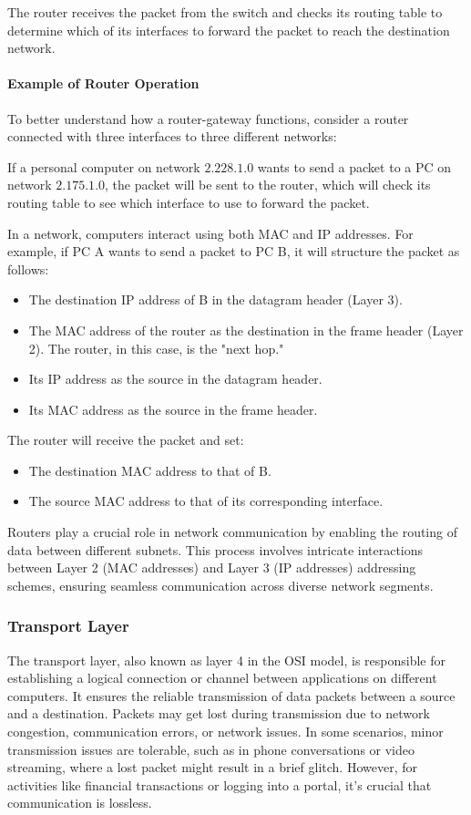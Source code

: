 The router receives the packet from the switch and checks its routing table to determine which of its interfaces to forward the packet to reach the destination network.

\paragraph{Example of Router Operation}
To better understand how a router-gateway functions, consider a router connected with three interfaces to three different networks:

If a personal computer on network $2.228.1.0$ wants to send a packet to a PC on network $2.175.1.0$, the packet will be sent to the router, which will check its routing table to see which interface to use to forward the packet.

In a network, computers interact using both MAC and IP addresses. For example, if PC A wants to send a packet to PC B, it will structure the packet as follows:

\begin{itemize}
    \item The destination IP address of B in the datagram header (Layer 3).
    \item The MAC address of the router as the destination in the frame header (Layer 2). The router, in this case, is the "next hop."
    \item Its IP address as the source in the datagram header.
    \item Its MAC address as the source in the frame header.
\end{itemize}

The router will receive the packet and set:
\begin{itemize}
    \item The destination MAC address to that of B.
    \item The source MAC address to that of its corresponding interface.
\end{itemize}

Routers play a crucial role in network communication by enabling the routing of data between different subnets. This process involves intricate interactions between Layer 2 (MAC addresses) and Layer 3 (IP addresses) addressing schemes, ensuring seamless communication across diverse network segments.

\subsubsection{\textbf{Transport Layer}}
The transport layer, also known as layer 4 in the OSI model, is responsible for establishing a logical connection or channel between applications on different computers. It ensures the reliable transmission of data packets between a source and a destination. Packets may get lost during transmission due to network congestion, communication errors, or network issues. In some scenarios, minor transmission issues are tolerable, such as in phone conversations or video streaming, where a lost packet might result in a brief glitch. However, for activities like financial transactions or logging into a portal, it's crucial that communication is lossless.

